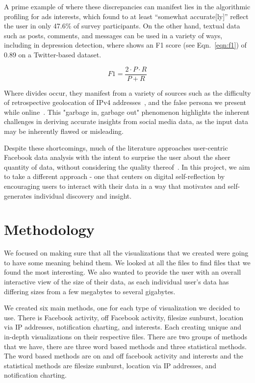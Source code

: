 \documentclass[conference, letterpaper, 11pt]{IEEEtran}
\begin{document}
A prime example of where these discrepancies can manifest lies in the algorithmic profiling for ads interests, which \cite{algprof} found to at least “somewhat accurate[ly]” reflect the user in only 47.6\% of survey participants. On the other hand, textual data such as posts, comments, and messages can be used in a variety of ways, including in depression detection, where \cite{depression} shows an F1 score (see Eqn.~\ref{eqn:f1}) of 0.89 on a Twitter-based dataset.

\begin{equation}
    F1 = \frac{2 \cdot P \cdot R}{P + R}\label{eqn:f1}
\end{equation}

Where divides occur, they manifest from a variety of sources such as the difficulty of retrospective geolocation of IPv4 addresses~\cite{ipgeo}, and the false persona we present while online~\cite{fbself}. This "garbage in, garbage out" phenomenon highlights the inherent challenges in deriving accurate insights from social media data, as the input data may be inherently flawed or misleading.

Despite these shortcomings, much of the literature approaches user-centric Facebook data analysis with the intent to surprise the user about the sheer quantity of data, without considering the quality thereof~\cite{surpriv, usercontext}. In this project, we aim to take a different approach - one that centers on digital self-reflection by encouraging users to interact with their data in a way that motivates and self-generates individual discovery and insight.

\section{Methodology} \label{ME}
We focused on making sure that all the visualizations that we created were going to have some meaning behind them. We looked at all the files to find files that we found the most interesting. We also wanted to provide the user with an overall interactive view of the size of their data, as each individual user's data has differing sizes from a few megabytes to several gigabytes.

We created six main methods, one for each type of visualization we decided to use. There is Facebook activity, off Facebook activity, filesize sunburst, location via IP addresses, notification charting, and interests. Each creating unique and in-depth visualizations on their respective files. There are two groups of methods that we have, there are three word based methods and three statistical methods. The word based methods are on and off facebook activity and interests and the statistical methods are filesize sunburst, location via IP addresses, and notification charting. 
\end{document}
